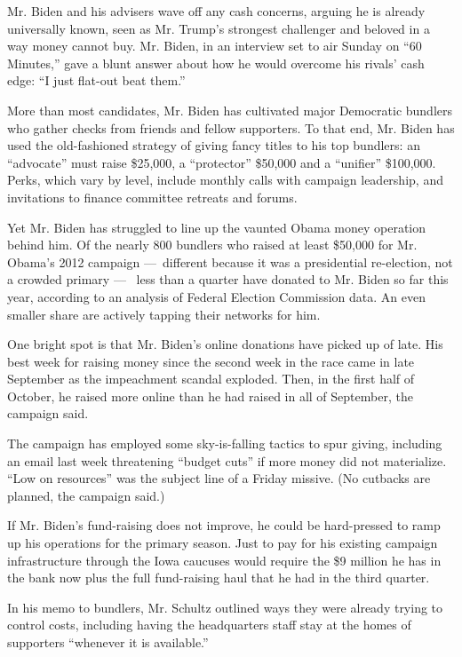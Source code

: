 Mr. Biden and his advisers wave off any cash concerns, arguing he is
already universally known, seen as Mr. Trump's strongest challenger and
beloved in a way money cannot buy. Mr. Biden, in an interview set to air
Sunday on ``60 Minutes,'' gave a blunt answer about how he would
overcome his rivals' cash edge: ``I just flat-out beat them.''

More than most candidates, Mr. Biden has cultivated major Democratic
bundlers who gather checks from friends and fellow supporters. To that
end, Mr. Biden has used the old-fashioned strategy of giving fancy
titles to his top bundlers: an ``advocate'' must raise \$25,000, a
``protector'' \$50,000 and a ``unifier'' \$100,000. Perks, which vary by
level, include monthly calls with campaign leadership, and invitations
to finance committee retreats and forums.

Yet Mr. Biden has struggled to line up the vaunted Obama money operation
behind him. Of the nearly 800 bundlers who raised at least \$50,000 for
Mr. Obama's 2012 campaign ---~different because it was a presidential
re-election, not a crowded primary ---~ less than a quarter have donated
to Mr. Biden so far this year, according to an analysis of Federal
Election Commission data. An even smaller share are actively tapping
their networks for him.

One bright spot is that Mr. Biden's online donations have picked up of
late. His best week for raising money since the second week in the race
came in late September as the impeachment scandal exploded. Then, in the
first half of October, he raised more online than he had raised in all
of September, the campaign said.

The campaign has employed some sky-is-falling tactics to spur giving,
including an email last week threatening ``budget cuts'' if more money
did not materialize. ``Low on resources'' was the subject line of a
Friday missive. (No cutbacks are planned, the campaign said.)

If Mr. Biden's fund-raising does not improve, he could be hard-pressed
to ramp up his operations for the primary season. Just to pay for his
existing campaign infrastructure through the Iowa caucuses would require
the \$9 million he has in the bank now plus the full fund-raising haul
that he had in the third quarter.

In his memo to bundlers, Mr. Schultz outlined ways they were already
trying to control costs, including having the headquarters staff stay at
the homes of supporters ``whenever it is available.''

